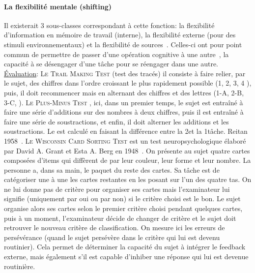         \paragraph{La flexibilité mentale (shifting)}
            Il existerait 3 sous-classes correspondant à cette fonction: \Li la flexibilité d'information en mémoire de travail (interne), \ii la flexibilité externe (pour des stimuli environnementaux) et \iii la flexibilité de sources~.
            Celles-ci ont pour point commun de permettre de passer d'une opération cognitive à une autre~, la capacité à se désengager d'une tâche pour se réengager dans une autre.
            \underline{Évaluation}: 
            \textsc{Le Trail Making Test} (test des tracés)
                    il consiste à faire relier, par le sujet, des chiffres dans l'ordre croissant le plus rapidement possible (1, 2, 3, 4 \etc), puis, il doit recommencer mais en alternant des chiffres et des lettres (1-A, 2-B, 3-C, \etc).
                \textsc{Le Plus-Minus Test}
                    , ici, dans un premier temps, le sujet est entraîné à faire une série d'additions sur des nombres à deux chiffres, puis il est entraîné à faire une série de soustractions, et enfin, il doit alterner les additions et les soustractions. 
                Le  est calculé en faisant la différence entre la 2\nd et la 1\iere tâche. Reitan 1958~.
                \textsc{Le Wisconsin Card Sorting Test}
                    est un test neuropsychologique élaboré par David A. Grant et Esta A. Berg en 1948~. On présente au sujet quatre cartes composées d'items qui diffèrent de par leur couleur, leur forme et leur nombre. La personne a, dans sa main, le paquet du reste des cartes. Sa tâche est de catégoriser une à une les cartes restantes en les posant sur l'un des quatre tas. On ne lui donne pas de critère pour organiser ses cartes mais l'examinateur lui signifie (uniquement par oui ou par non) si le critère choisi est le bon. Le sujet organise alors ses cartes selon le premier critère choisi pendant quelques cartes, puis à un moment, l'examinateur décide de changer de critère et le sujet doit retrouver le nouveau critère de classification.
                    On mesure ici les erreurs de persévérance (\cad quand le sujet persévère dans le critère qui lui est devenu routinier). Cela permet de déterminer la capacité du sujet à intégrer le feedback externe, mais également s'il est capable d'inhiber une réponse qui lui est devenue routinière.
